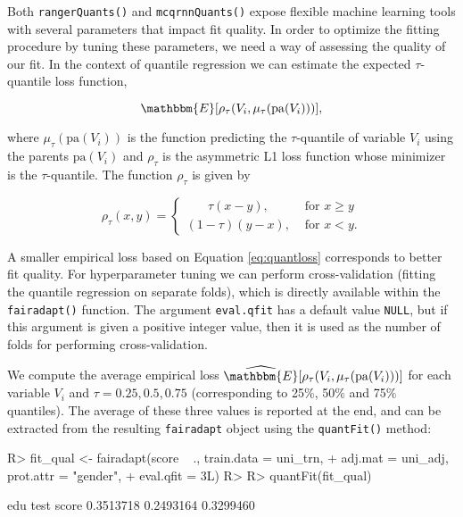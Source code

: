 \documentclass[
  nojss]{jss}
\begin{document}
Both \texttt{rangerQuants()} and \texttt{mcqrnnQuants()} expose flexible
machine learning tools with several parameters that impact fit quality.
In order to optimize the fitting procedure by tuning these parameters,
we need a way of assessing the quality of our fit. In the context of
quantile regression we can estimate the expected \(\tau\)-quantile loss
function,

\begin{equation}
\label{eq:quantloss}
\mathbbm{E}[\rho_{\tau}(V_i, \mu_{\tau}(\mathrm{pa}(V_i)))],
\end{equation}

where \(\mu_{\tau}(\mathrm{pa}(V_i))\) is the function predicting the
\(\tau\)-quantile of variable \(V_i\) using the parents
\(\mathrm{pa}(V_i)\) and \(\rho_{\tau}\) is the asymmetric L1 loss
function whose minimizer is the \(\tau\)-quantile. The function
\(\rho_{\tau}\) is given by

\[
\rho_{\tau}(x, y) = \begin{cases}
                      \phantom{( )}\tau(x-y), & \text{ for } x \geq y\\
                      (1-\tau)(y-x), & \text{ for } x < y.
                    \end{cases}
\]

A smaller empirical loss based on Equation \eqref{eq:quantloss}
corresponds to better fit quality. For hyperparameter tuning we can
perform cross-validation (fitting the quantile regression on separate
folds), which is directly available within the \texttt{fairadapt()}
function. The argument \texttt{eval.qfit} has a default value
\texttt{NULL}, but if this argument is given a positive integer value,
then it is used as the number of folds for performing cross-validation.

We compute the average empirical loss
\(\widehat{\mathbbm{E}} [\rho_{\tau} (V_i, \mu_{\tau}(\mathrm{pa}(V_i)))]\)
for each variable \(V_i\) and \(\tau = 0.25, 0.5, 0.75\) (corresponding
to 25\%, 50\% and 75\% quantiles). The average of these three values is
reported at the end, and can be extracted from the resulting
\texttt{fairadapt} object using the \texttt{quantFit()} method:

\begin{CodeChunk}
\begin{CodeInput}
R> fit_qual <- fairadapt(score ~ ., train.data = uni_trn,
+                       adj.mat = uni_adj, prot.attr = "gender",
+                       eval.qfit = 3L)
R> 
R> quantFit(fit_qual)
\end{CodeInput}
\begin{CodeOutput}
      edu      test     score 
0.3513718 0.2493164 0.3299460 
\end{CodeOutput}
\end{CodeChunk}
\end{document}
